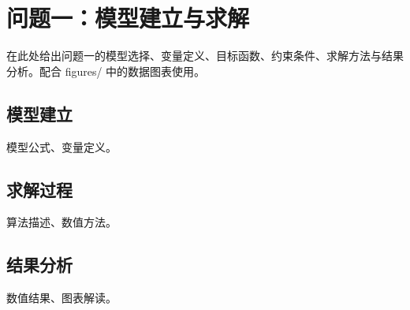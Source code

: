 \section{问题一：模型建立与求解}

在此处给出问题一的模型选择、变量定义、目标函数、约束条件、求解方法与结果分析。配合 figures/ 中的数据图表使用。

\subsection{模型建立}

模型公式、变量定义。

\subsection{求解过程}

算法描述、数值方法。

\subsection{结果分析}

数值结果、图表解读。
